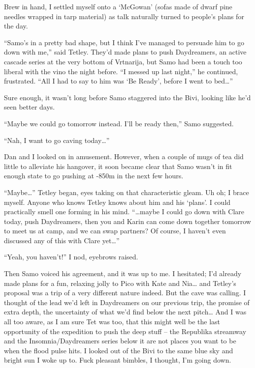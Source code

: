Brew in hand, I settled myself onto a `McGowan' (sofas made of dwarf
pine needles wrapped in tarp material) as talk naturally turned to
people's plans for the day.

``Samo's in a pretty bad shape, but I think I've managed to persuade him
to go down with me,'' said Tetley. They'd made plans to push
Daydreamers, an active cascade series at the very bottom of Vrtnarija,
but Samo had been a touch too liberal with the vino the night before.
``I messed up last night,'' he continued, frustrated. ``All I had to say
to him was `Be Ready', before I went to bed\ldots{}''

Sure enough, it wasn't long before Samo staggered into the Bivi, looking
like he'd seen better days.

``Maybe we could go tomorrow instead. I'll be ready then,'' Samo
suggested.

``Nah, I want to go caving today\ldots{}''

Dan and I looked on in amusement. However, when a couple of mugs of tea
did little to alleviate his hangover, it soon became clear that Samo
wasn't in fit enough state to go pushing at -850m in the next few hours.

``Maybe\ldots{}'' Tetley began, eyes taking on that characteristic
gleam. Uh oh; I brace myself. Anyone who knows Tetley knows about him
and his `plans'. I could practically smell one forming in his mind.
``\ldots{}maybe I could go down with Clare today, push Daydreamers, then
you and Karin can come down together tomorrow to meet us at camp, and we
can swap partners? Of course, I haven't even discussed any of this with
Clare yet\ldots{}''

``Yeah, you haven't!'' I nod, eyebrows raised.

Then Samo voiced his agreement, and it was up to me. I hesitated; I'd
already made plans for a fun, relaxing jolly to Pico with Kate and
Nia\ldots{} and Tetley's proposal was a trip of a very different nature
indeed. But the cave was calling. I thought of the lead we'd left in
Daydreamers on our previous trip, the promise of extra depth, the
uncertainty of what we'd find below the next pitch\ldots{} And I was all
too aware, as I am sure Tet was too, that this might well be the last
opportunity of the expedition to push the deep stuff -- the Republika
streamway and the Insomnia/Daydreamers series below it are not places
you want to be when the flood pulse hits. I looked out of the Bivi to
the same blue sky and bright sun I woke up to. Fuck pleasant bimbles, I
thought, I'm going down.

